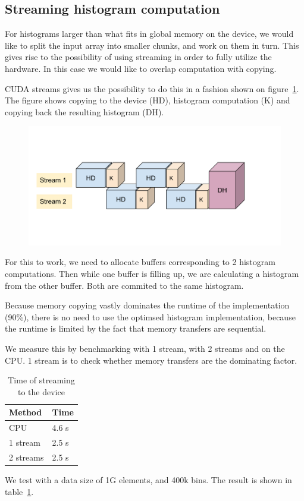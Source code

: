 \documentclass[12pt, a4paper, hidelinks]{article}
\begin{document}
\subsection{Streaming histogram computation}
For histograms larger than what fits in global memory on the device, we would like to split
the input array into smaller chunks, and work on them in turn. This gives rise to the possibility
of using streaming in order to fully utilize the hardware. In this case we would like to overlap
computation with copying.

CUDA streams gives us the possibility to do this in a fashion shown on figure~\ref{fig:cuda-stream}.
The figure shows copying to the device (HD), histogram computation (K) and copying back the resulting histogram (DH).

\begin{figure}[htpb]
    \centering
    \includegraphics[width=0.8\linewidth]{img/cuda-stream.pdf}
    \label{fig:cuda-stream}
\end{figure}

For this to work, we need to allocate buffers corresponding to 2 histogram computations.
Then while one buffer is filling up, we are calculating a histogram from the other
buffer. Both are commited to the same histogram.

Because memory copying vastly dominates the runtime of the implementation (90\%),
there is no need to use the optimsed histogram implementation, because the runtime
is limited by the fact that memory transfers are sequential.

We measure this by benchmarking with 1 stream, with 2 streams and on the CPU. 1 stream
is to check whether memory transfers are the dominating factor.

\begin{table}[htpb]
    \centering
    \begin{tabular}{l l}
        Method & Time \\
        \hline
        CPU & 4.6 s \\
        1 stream & 2.5 s \\
        2 streams & 2.5 s \\
        \hline
    \end{tabular}
    \caption{Time of streaming to the device}
    \label{tab:stream}
\end{table}
We test with a data size of 1G elements, and 400k bins. The result is shown in table~\ref{tab:stream}.
\end{document}
